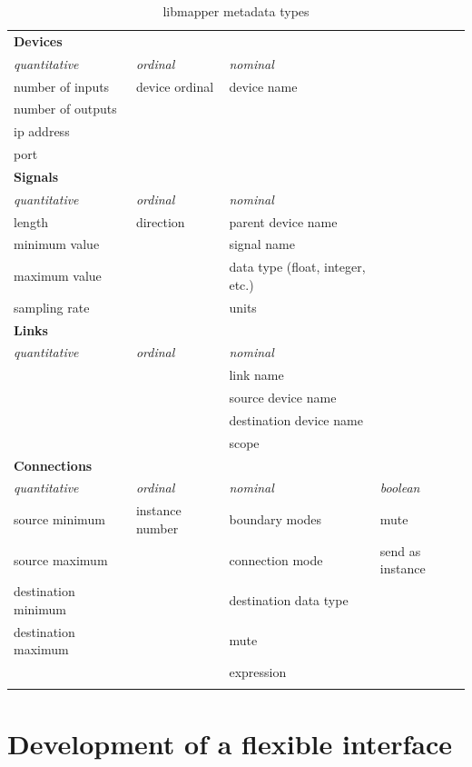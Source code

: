 \begin{longtable}{l l l l}
\caption[libmapper metadata types]{libmapper metadata types} \label{tab:metadata_types} \\

	\hline\hline
	\textbf{Devices} & & \\
	\emph{quantitative} & \emph{ordinal} & \emph{nominal}\\
	\hline
	number of inputs & device ordinal & device name\\
		number of outputs \\
	ip address \\
	port \\ [0.7cm]

	\hline\hline
	\textbf{Signals} & & \\
	\emph{quantitative} & \emph{ordinal} & \emph{nominal}\\
	\hline
	length & direction & parent device name\\
	minimum value & & signal name \\
	maximum value & & data type (float, integer, etc.)\\
	sampling rate & & units \\ [0.7cm]

	\hline\hline
	\textbf{Links} & & \\
	\emph{quantitative} & \emph{ordinal} & \emph{nominal}\\
	\hline
	& & link name \\
	& & source device name \\
	& & destination device name \\
	& & scope \\ [0.7cm]

	\hline\hline
	\textbf{Connections} & & \\
	\emph{quantitative} & \emph{ordinal} & \emph{nominal} & \emph{boolean}\\
	\hline
	source minimum & instance number & boundary modes & mute\\
	source maximum & & connection mode & send as instance\\
	destination minimum & & destination data type \\
	destination maximum & & mute \\
	& & expression \\
	& & \\
\end{longtable}

\section{Development of a flexible interface}
	
